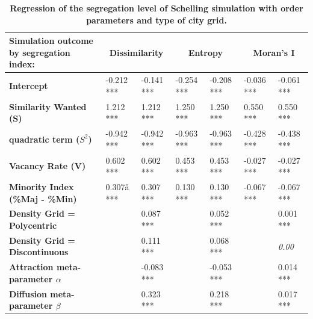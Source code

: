 \documentclass[3p,times,procedia]{elsarticle}
\begin{document}
\begin{table}[]
\centering
\begin{threeparttable}
\caption{\textbf{Regression of the segregation level of Schelling simulation with order parameters and type of city grid.}}
\label{tab:regressionSchelling}
\begin{tabular}{|m{2.5cm}|ll|ll|ll|}
\hline
Simulation outcome by segregation index:    & \multicolumn{2}{c|}{\textbf{Dissimilarity}}   & \multicolumn{2}{c|}{\textbf{Entropy}} & \multicolumn{2}{c|}{\textbf{Moran's I}} \\ \hline
\textbf{Intercept}                          & -0.212 *** & -0.141 ***                       & -0.254 ***        & -0.208 ***        & -0.036 ***           & -0.061 ***               \\ \hline
\textbf{Similarity Wanted (S)}              & 1.212 ***  & 1.212 ***                        & 1.250 ***         & 1.250 ***         & 0.550 ***            & 0.550 ***                \\ 
\textbf{quadratic term ($S^2$)}               & -0.942 *** & -0.942 ***                       & -0.963 ***        & -0.963 ***        & -0.428 ***           & -0.438 ***               \\ 
\textbf{Vacancy Rate (V)}                   & 0.602 ***  & 0.602 ***                        & 0.453 ***         & 0.453 ***         & -0.027 ***           & -0.027 ***               \\ 
\textbf{Minority Index (\%Maj - \%Min)}     & 0.307å ***  & 0.307 ***                        & 0.130 ***         & 0.130 ***         & -0.067 ***           & -0.067 ***               \\ \hline
\textbf{Density Grid = Polycentric}         &            & 0.087 ***                        &                   & 0.052 ***         &                      & 0.001 ***                \\ 
\textbf{Density Grid = Discontinuous}       &            & 0.111 ***                        &                   & 0.068 ***         &                      & \textit{0.00}              \\
\textbf{Attraction meta-parameter $\alpha$} &            & -0.083 ***                       &                   & -0.053 ***        &                      & 0.014 ***                \\ 
\textbf{Diffusion meta-parameter $\beta$}   &            & 0.323 ***                        &                   & 0.218 ***         &                      & 0.017 ***           \\ \hline

\end{tabular}
\end{threeparttable}
\end{table}
\end{document}
